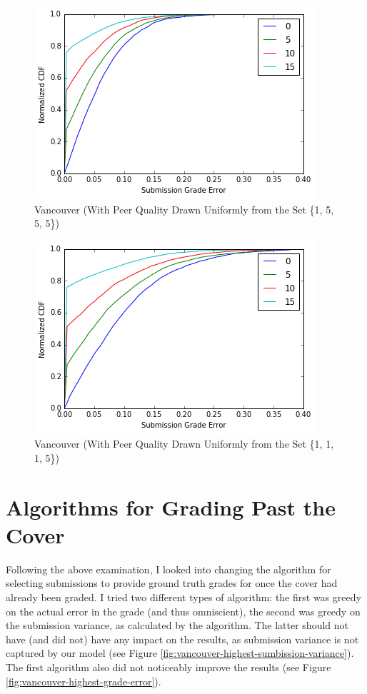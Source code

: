 \documentclass{article}
\begin{document}
	\begin{figure}[h]
		\includegraphics{vancouver-skewed.png}
		\caption{Vancouver (With Peer Quality Drawn Uniformly from the Set \{1, 5, 5, 5\})}
		\label{fig:vancouver-skewed}
	\end{figure}
	
	\begin{figure}[h]
		\includegraphics{vancouver-skewed-low.png}
		\caption{Vancouver (With Peer Quality Drawn Uniformly from the Set \{1, 1, 1, 5\})}
		\label{fig:vancouver-skewed-low}
	\end{figure}
	
	
	\section{Algorithms for Grading Past the Cover}
	Following the above examination, I looked into changing the algorithm for selecting submissions to provide ground truth grades for once the cover had already been graded. I tried two different types of algorithm: the first was greedy on the actual error in the grade (and thus omniscient), the second was greedy on the submission variance, as calculated by the algorithm. The latter should not have (and did not) have any impact on the results, as submission variance is not captured by our model (see Figure \ref{fig:vancouver-highest-sumbission-variance}). The first algorithm also did not noticeably improve the results (see Figure \ref{fig:vancouver-highest-grade-error}).
	
\end{document}
